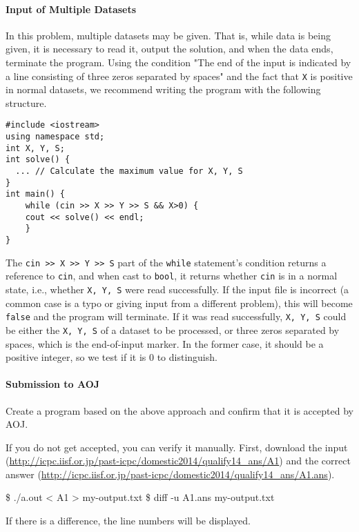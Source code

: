 \paragraph{Input of Multiple Datasets}
In this problem, multiple datasets may be given. That is, while data is being given, it is necessary to read it, output the solution, and when the data ends, terminate the program. Using the condition "The end of the input is indicated by a line consisting of three zeros separated by spaces" and the fact that \texttt{X} is positive in normal datasets, we recommend writing the program with the following structure.

\begin{cbox}
\begin{verbatim}
#include <iostream>
using namespace std;
int X, Y, S;
int solve() {
  ... // Calculate the maximum value for X, Y, S
}
int main() {
    while (cin >> X >> Y >> S && X>0) {
	cout << solve() << endl;
    }
}
\end{verbatim}
\end{cbox}

The \texttt{cin >> X >> Y >> S} part of the \texttt{while} statement's condition returns a reference to \texttt{cin}, and when cast to \texttt{bool}, it returns whether \texttt{cin} is in a normal state, i.e., whether \texttt{X, Y, S} were read successfully. If the input file is incorrect (a common case is a typo or giving input from a different problem), this will become \texttt{false} and the program will terminate. If it was read successfully, \texttt{X, Y, S} could be either the \texttt{X, Y, S} of a dataset to be processed, or three zeros separated by spaces, which is the end-of-input marker. In the former case, it should be a positive integer, so we test if it is 0 to distinguish.

\paragraph{Submission to AOJ}

Create a program based on the above approach and confirm that it is accepted by AOJ.

If you do not get accepted, you can verify it manually. First, download the input
(\url{http://icpc.iisf.or.jp/past-icpc/domestic2014/qualify14_ans/A1})
and the correct answer
(\url{http://icpc.iisf.or.jp/past-icpc/domestic2014/qualify14_ans/A1.ans}).
\begin{terminal}
  \$ ./a.out < A1 > my-output.txt
  \$ diff -u A1.ans my-output.txt 
\end{terminal}
If there is a difference, the line numbers will be displayed.

